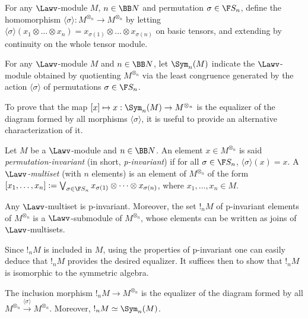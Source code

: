 For any $\Lawv$-module $M$, $n\in \BB N$ and permutation $\sigma\in \F S_{n}$, define the homomorphism $\langle \sigma\rangle: M^{\otimes_{n}}\to M^{\otimes_{n}}$ by letting 
$\langle\sigma\rangle (x_{1}\otimes \dots \otimes x_{n})=x_{\sigma(1)}\otimes \dots \otimes x_{\sigma(n)}$ on basic tensors, and extending by continuity on the whole tensor module. 


\begin{definition}

For any $\Lawv$-module $M$ and $n\in \BB N$, let $\Sym_{n}(M)$ indicate the $\Lawv$-module obtained by quotienting 
$M^{\otimes_{n}}$ via the least congruence generated by the action $\langle \sigma \rangle$ of permutations $\sigma\in \F S_{n}$.
\end{definition}


To prove that the map $[x]\mapsto x:\Sym_{n}(M)\to M^{\otimes_{n}} $ is the equalizer of the diagram formed by all morphisms $\langle \sigma\rangle$, it is useful to provide an alternative characterization of it. 

\begin{definition}
Let $M$ be a $\Lawv$-module and $n\in \BB N$. An element $x\in M^{\otimes_{n}}$ is said \emph{permutation-invariant} (in short, \emph{p-invariant}) if for all $\sigma\in \F S_{n}$, 
$\langle \sigma \rangle (x)=x$. 
 A \emph{$\Lawv$-multiset} (with $n$ elements) is an element of $M^{\otimes_{n}}$ of the form 
$ [x_{1},\dots, x_{n}]:= \bigvee_{\sigma\in \F S_{n}}
 x_{\sigma(1)}\otimes \dots \otimes x_{\sigma(n)}$, where $x_{1},\dots, x_{n}\in M$.
\end{definition} 

\begin{proposition}
Any $\Lawv$-multiset is p-invariant. Moreover, the set $!_{n}M$ of p-invariant elements of $M^{\otimes_{n}}$ is a $\Lawv$-submodule of $M^{\otimes_{n}}$, whose elements can be written as joins of $\Lawv$-multisets.
\end{proposition}

Since $!_{n}M$ is included in $M$, using the properties of p-invariant one can easily deduce that $!_{n}M$ provides the desired equalizer. It suffices then to show that $!_{n}M$ is isomorphic to the symmetric algebra.


\begin{proposition}
The inclusion morphism $!_{n}M \to M^{\otimes_{n}}$ is the equalizer of the diagram formed by all $M^{\otimes_{n}}\stackrel{\langle \sigma\rangle}{\to} M^{\otimes_{n}}$. Moreover, 
$!_{n}M \simeq \Sym_{n}(M)$.
\end{proposition}


